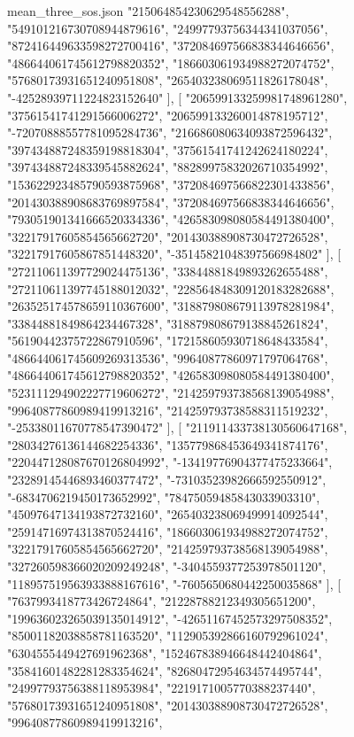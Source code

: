 \begin{filecontents*}[overwrite]{mean_three_sos.json}
    "215064854230629548556288",
    "549101216730708944879616",
    "24997793756344341037056",
    "872416449633598272700416",
    "372084697566838344646656",
    "486644061745612798820352",
    "186603061934988272074752",
    "57680173931651240951808",
    "265403238069511826178048",
    "-42528939711224823152640"
   ],
   [
    "206599133259981748961280",
    "37561541741291566006272",
    "206599133260014878195712",
    "-72070888557781095284736",
    "216686080634093872596432",
    "397434887248359198818304",
    "37561541741242624180224",
    "397434887248339545882624",
    "88289975832026710354992",
    "153622923485790593875968",
    "372084697566822301433856",
    "201430388908683769897584",
    "372084697566838344646656",
    "793051901341666520334336",
    "426583098080584491380400",
    "32217917605854565662720",
    "201430388908730472726528",
    "32217917605867851448320",
    "-35145821048397566984802"
   ],
   [
    "272110611397729024475136",
    "33844881849893262655488",
    "272110611397745188012032",
    "228564848309120183282688",
    "263525174578659110367600",
    "318879808679113978281984",
    "33844881849864234467328",
    "318879808679138845261824",
    "56190442375722867910596",
    "172158605930718648433584",
    "486644061745609269313536",
    "99640877860971797064768",
    "486644061745612798820352",
    "426583098080584491380400",
    "523111294902227719606272",
    "214259793738568139054988",
    "99640877860989419913216",
    "214259793738588311519232",
    "-25338011670778547390472"
   ],
   [
    "211911433738130560647168",
    "28034276136144682254336",
    "135779868453649341874176",
    "220447128087670126804992",
    "-13419776904377475233664",
    "23289145446893460377472",
    "-73103523982666592550912",
    "-6834706219450173652992",
    "78475059485843033903310",
    "45097647134193872732160",
    "265403238069499914092544",
    "25914716974313870524416",
    "186603061934988272074752",
    "32217917605854565662720",
    "214259793738568139054988",
    "327260598366020209249248",
    "-3404559377253978501120",
    "118957519563933888167616",
    "-7605650680442250035868"
   ],
   [
    "7637993418773426724864",
    "21228788212349305651200",
    "199636023265039135014912",
    "-42651167452573297508352",
    "85001182038858781163520",
    "112905392866160792961024",
    "6304555449427691962368",
    "152467838946648442404864",
    "35841601482281283354624",
    "82680472954634574495744",
    "24997793756388118953984",
    "2219171005770388237440",
    "57680173931651240951808",
    "201430388908730472726528",
    "99640877860989419913216",

\end{filecontents*}
